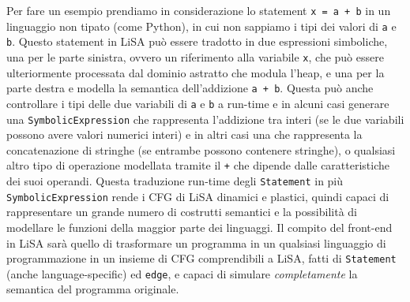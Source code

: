 Per fare un esempio prendiamo in considerazione lo statement \texttt{x = a + b} in un linguaggio non tipato (come Python), in cui non sappiamo i tipi dei valori di \texttt{a} e \texttt{b}. Questo statement in LiSA può essere tradotto in due espressioni simboliche, una per le parte sinistra, ovvero un riferimento alla variabile \texttt{x}, che può essere ulteriormente processata dal dominio astratto che modula l'heap, e una per la parte destra e modella la semantica dell'addizione \texttt{a + b}. Questa può anche controllare i tipi delle due variabili di \texttt{a} e \texttt{b} a run-time e in alcuni casi generare una \texttt{SymbolicExpression} che rappresenta l'addizione tra interi (se le due variabili possono avere valori numerici interi) e in altri casi una che rappresenta la concatenazione di stringhe (se entrambe possono contenere stringhe), o qualsiasi altro tipo di operazione modellata tramite il \texttt{+} che dipende dalle caratteristiche dei suoi operandi.
Questa traduzione run-time degli \texttt{Statement} in più \texttt{SymbolicExpression} rende i CFG di LiSA dinamici e plastici, quindi capaci di rappresentare un grande numero di costrutti semantici e la possibilità di modellare le funzioni della maggior parte dei linguaggi. Il compito del front-end in LiSA sarà quello di trasformare un programma in un qualsiasi linguaggio di programmazione in un insieme di CFG comprendibili a LiSA, fatti di \texttt{Statement} (anche language-specific) ed \texttt{edge}, e capaci di simulare \textit{completamente} la semantica del programma originale.


